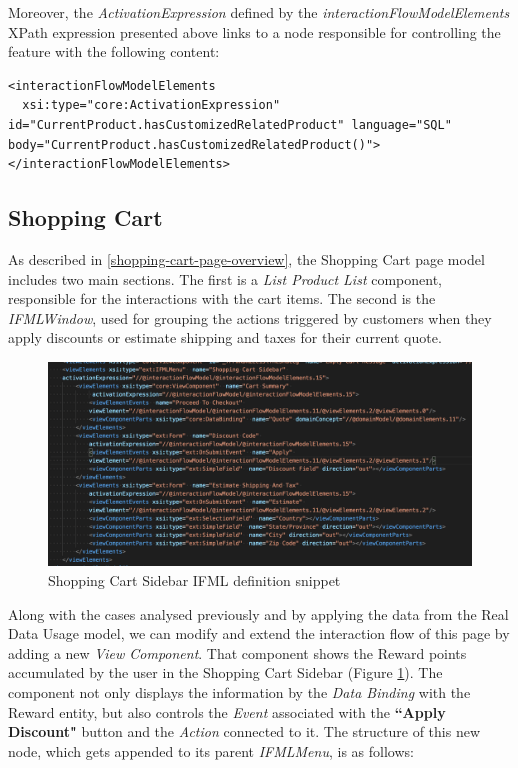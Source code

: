 Moreover, the \textit{ActivationExpression} defined by the \textit{interactionFlowModelElements} XPath expression presented above links to a node responsible for controlling the feature with the following content:

\vspace{0.5cm}
\lstset{language=XML}
\begin{lstlisting} 
<interactionFlowModelElements 
  xsi:type="core:ActivationExpression" id="CurrentProduct.hasCustomizedRelatedProduct" language="SQL" body="CurrentProduct.hasCustomizedRelatedProduct()">
</interactionFlowModelElements>

\end{lstlisting}
\newpage
\vspace{0.5cm}
\subsection{Shopping Cart}
\label{shopping-cart-updates}

As described in \ref{shopping-cart-page-overview}, the Shopping Cart page model includes two main sections. The first is a \textit{List Product List} component, responsible for the interactions with the cart items. The second is the \textit{IFMLWindow}, used for grouping the actions triggered by customers when they apply discounts or estimate shipping and taxes for their current quote.

\vspace{0.5cm}
\begin{figure}[H]
  \centering
    \includegraphics[width=12cm]{images/madison/ifml-shopping-cart-sidebar.png}
  \caption{Shopping Cart Sidebar IFML definition snippet}
  \label{fig:shopping-cart-sidebar-ifml-definition}
\end{figure}
\vspace{0.5cm}

Along with the cases analysed previously and by applying the data from the Real Data Usage model, we can modify and extend the interaction flow of this page by adding a new \textit{View Component}. That component shows the Reward points accumulated by the user in the Shopping Cart Sidebar (Figure \ref{fig:shopping-cart-sidebar-ifml-definition}). The component not only displays the information by the \textit{Data Binding} with the Reward entity, but also controls the \textit{Event} associated with the \textbf{``Apply Discount"} button and the \textit{Action} connected to it. 
The structure of this new node, which gets appended to its parent \textit{IFMLMenu}, is as follows:

